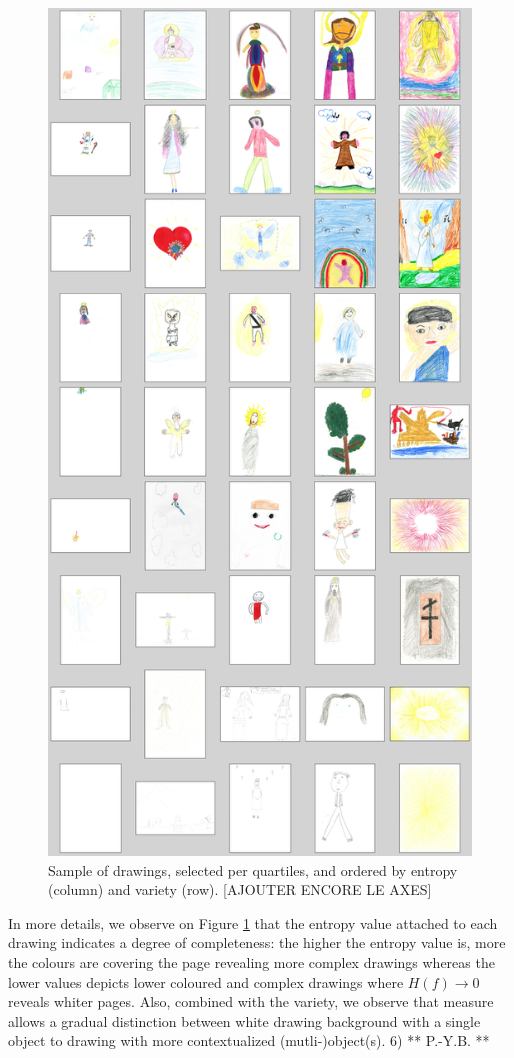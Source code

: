 \documentclass[11pt,a4paper]{article}
\begin{document}
\begin{figure}
	\centering
	\includegraphics[width=0.75\linewidth]{figures/colors-grille.png}
	\caption{Sample of drawings, selected per quartiles, and ordered by entropy (column) and variety (row). {\color{red}[AJOUTER ENCORE LE AXES]}}
	\label{fig:grille}
\end{figure}

In more details, we observe on Figure \ref{fig:grille} that the entropy value attached to each drawing indicates a degree of completeness: the higher the entropy value is, more the colours are covering the page revealing more complex drawings whereas the lower values depicts lower coloured and complex drawings where $H(f) \rightarrow 0$ reveals whiter pages.
Also, combined with the variety, we observe that measure allows a gradual distinction between white drawing background with a single object to drawing with more contextualized (mutli-)object(s).
{\color{red} 6) ** P.-Y.B. **}
\end{document}
